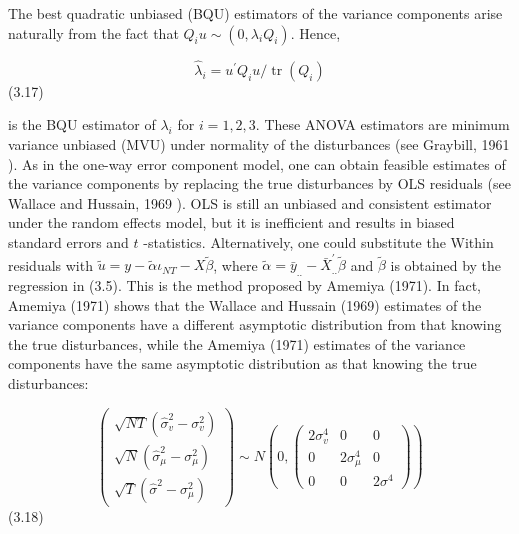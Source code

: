 \documentclass[
]{book}
\begin{document}
The best quadratic unbiased (BQU) estimators of the variance components arise naturally from the fact that \(Q_{i} u \sim\left(0, \lambda_{i} Q_{i}\right) .\) Hence,

\begin{equation}
\widehat{\lambda}_{i}=u^{\prime} Q_{i} u / \operatorname{tr}\left(Q_{i}\right)
\end{equation} (3.17)

is the BQU estimator of \(\lambda_{i}\) for \(i=1,2,3\). These ANOVA estimators are minimum variance unbiased (MVU) under normality of the disturbances (see Graybill, 1961 ). As in the one-way error component model, one can obtain feasible estimates of the variance components by replacing the true disturbances by OLS residuals (see Wallace and Hussain, 1969 ). OLS is still an unbiased and consistent estimator under the random effects model, but it is inefficient and results in biased standard errors and \(t\) -statistics. Alternatively, one could substitute the Within residuals with \(\tilde{u}=y-\widetilde{\alpha} \iota_{N T}-X \widetilde{\beta}\), where \(\tilde{\alpha}=\bar{y}_{. .}-\bar{X}_{. .}^{\prime} \tilde{\beta}\) and \(\widetilde{\beta}\) is obtained by the regression
in (3.5). This is the method proposed by Amemiya (1971). In fact, Amemiya (1971) shows that the Wallace and Hussain (1969) estimates of the variance components have a different asymptotic distribution from that knowing the true disturbances, while the Amemiya (1971) estimates of the variance components have the same asymptotic distribution as that knowing the true disturbances:

\begin{equation}
\left(\begin{array}{c}
\sqrt{N T}\left(\widehat{\sigma}_{v}^{2}-\sigma_{v}^{2}\right) \\
\sqrt{N}\left(\widehat{\sigma}_{\mu}^{2}-\sigma_{\mu}^{2}\right) \\
\sqrt{T}\left(\widehat{\sigma}^{2}-\sigma_{\mu}^{2}\right)
\end{array}\right) \sim N\left(0,\left(\begin{array}{ccc}
2 \sigma_{v}^{4} & 0 & 0 \\
0 & 2 \sigma_{\mu}^{4} & 0 \\
0 & 0 & 2 \sigma^{4}
\end{array}\right)\right)
\end{equation} (3.18)
\end{document}
